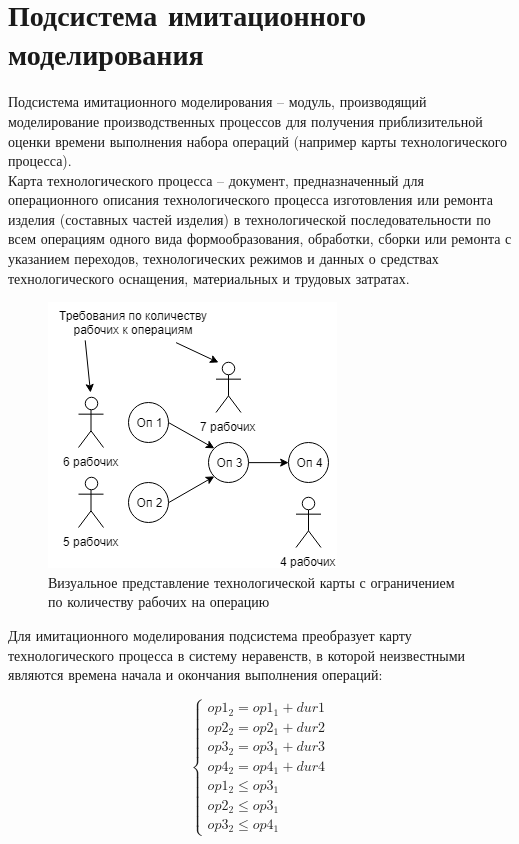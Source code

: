 \section{Подсистема имитационного моделирования}
\indent Подсистема имитационного моделирования -- модуль, производящий моделирование производственных процессов для получения приблизительной оценки времени выполнения набора операций (например карты технологического процесса).\\
\indent Карта технологического процесса -- документ, предназначенный для операционного описания технологического процесса изготовления или ремонта изделия (составных частей изделия) в технологической последовательности по всем операциям одного вида формообразования, обработки, сборки или ремонта с указанием переходов, технологических режимов и данных о средствах технологического оснащения, материальных и трудовых затратах.

\begin{figure}[ht]
	\centering
	\includegraphics[width=0.6\linewidth]{pics/techMapViz.png}
	\caption{Визуальное представление технологической карты с ограничением по количеству рабочих на операцию}
	\label{fig:map}
\end{figure}

\indent Для имитационного моделирования подсистема преобразует карту технологического процесса в систему неравенств, в которой неизвестными являются времена начала и окончания выполнения операций:

\begin{equation}
	\label{eq:system}
	\begin{cases}
		op1_2 = op1_1 + dur1\\
		op2_2 = op2_1 + dur2\\
		op3_2 = op3_1 + dur3\\
		op4_2 = op4_1 + dur4\\
		op1_2 \leq op3_1\\
		op2_2 \leq op3_1\\
		op3_2 \leq op4_1
	\end{cases}
\end{equation}

